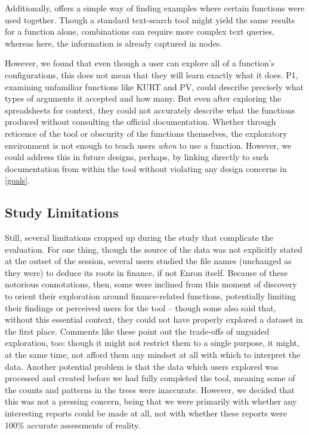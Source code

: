 \documentclass[conference]{IEEEtran}
\begin{document}
	Additionally, \toolname offers a simple way of finding examples where certain functions
	were used together. Though a standard text-search tool might yield the same
	results for a function alone, combinations can require more complex text
	queries, whereas here, the information is already captured in nodes.  \par
	
	However, we found that even though a user can explore all of a function's configurations, this
	does not mean that they will learn exactly what it does. P1,
	examining unfamiliar functions like
	KURT and PV, could describe precisely what types of arguments it accepted and
	how many. But even after exploring the spreadsheets for context, they could not
	accurately describe what the functions produced without consulting the official
	documentation. Whether through reticence of the tool or obscurity of the
	functions themselves, the exploratory environment is not enough to teach users
	\textit{when} to use a function. However, we could address this in future designs,
	perhaps, by linking directly to such documentation from within the
	tool without violating any design concerns in \ref{goals}. \par	

	\subsection{Study Limitations}
	
	Still, several limitations cropped up during the study that complicate the
	evaluation. For one thing, though the source of the data was not explicitly
	stated at the outset of the session, several users studied the file names
	(unchanged as they were) to deduce its roots in finance, if not Enron itself.
	Because of these notorious connotations, then, some were inclined from this
	moment of discovery to orient their exploration around finance-related
	functions, potentially limiting their findings or perceived users for the tool
	-- though some also said that, without this essential context, they could not
	have properly explored a dataset in the first place. Comments like these point
	out the trade-offs of unguided exploration, too: though it might not restrict
	them to a single purpose, it might, at the same time, not afford them any
	mindset at all with which to interpret the data. Another potential problem is
	that the data which users explored was processed and created before we had
	fully completed the tool, meaning some of the counts and patterns in the trees
	were inaccurate. However, we decided that this was not a pressing concern,
	being that we were primarily with whether any interesting reports could be made
	at all, not with whether these reports were 100\% accurate assessments of
	reality. \par
	
\end{document}
